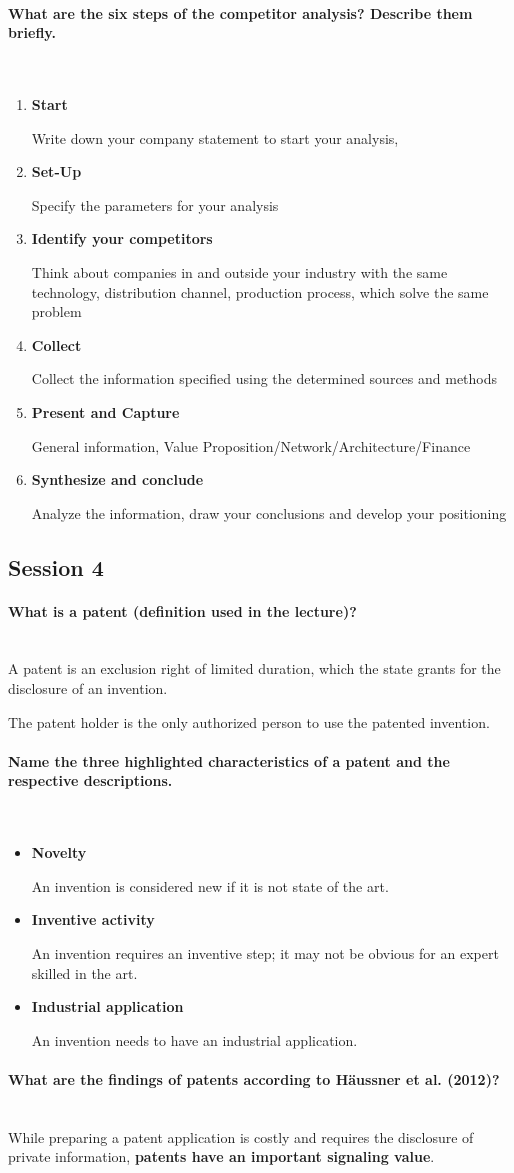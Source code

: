 \documentclass[10pt,a4paper,noendnumber=true]{scrartcl}
\newcommand{\properparagraph}[1]{\paragraph{\textcolor{Emerald}{#1}}\mbox{}\\}
\begin{document}
\properparagraph{What are the six steps of the competitor analysis? Describe them briefly.}
\begin{enumerate}
	\item \textbf{Start}
	
	Write down your company statement to start your analysis,
	\item \textbf{Set-Up}
	
	Specify the parameters for your analysis
	\item \textbf{Identify your competitors}
	
	 Think about companies in and outside your industry with the same technology, distribution channel, production process, which solve the same problem
	\item \textbf{Collect}

	 Collect the information specified using the determined sources and methods
	\item \textbf{Present and Capture}
	
	 General information, Value Proposition/Network/Architecture/Finance
	\item \textbf{Synthesize and conclude}
	
	 Analyze the information, draw your conclusions and develop your positioning
\end{enumerate}
\newpage
\subsection{Session 4}
\properparagraph{What is a patent (definition used in the lecture)?}
A patent is an exclusion right of limited duration, which the state grants for the disclosure of an invention.

The patent holder is the only authorized person to use the patented invention.
\properparagraph{Name the three highlighted characteristics of a patent and the respective descriptions.}

\begin{itemize}
	\item \textbf{Novelty}
	
	An invention is considered new if it is not state of the art.
	
	\item \textbf{Inventive activity}
	
	An invention requires an inventive step; it may not be obvious for an expert skilled in the art.
	
	\item \textbf{Industrial application}
	
	An invention needs to have an industrial application.
\end{itemize}
\properparagraph{What are the findings of patents according to Häussner et al. (2012)?}
While preparing a patent application is costly and requires the disclosure of private information, \textbf{patents have an important signaling value}.
\end{document}
